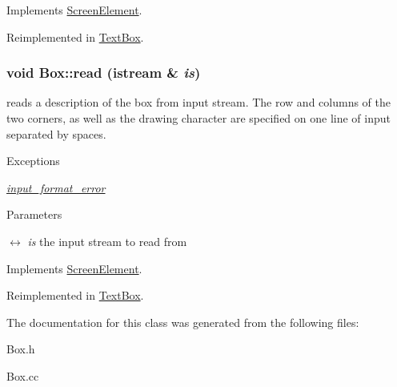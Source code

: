 Implements \hyperlink{classScreenElement_a1bf719edc836cc6ceaa84014c7342028}{ScreenElement}.

Reimplemented in \hyperlink{classTextBox_ae28a00e6cd50d5432c02b579b0fb32ed}{TextBox}.\hypertarget{classBox_ac0ea633a10bf980901766b7aaefdb912}{
\subsubsection[{read}]{\setlength{\rightskip}{0pt plus 5cm}void Box::read (istream \& {\em is})}}
\label{classBox_ac0ea633a10bf980901766b7aaefdb912}
reads a description of the box from input stream. The row and columns of the two corners, as well as the drawing character are specified on one line of input separated by spaces. 
\begin{DoxyExceptions}{Exceptions}
\item[{\em \hyperlink{classinput__format__error}{input\_\-format\_\-error}}]\end{DoxyExceptions}

\begin{DoxyParams}{Parameters}
\item[\mbox{$\leftrightarrow$} {\em is}]the input stream to read from \end{DoxyParams}


Implements \hyperlink{classScreenElement_ae5c8356d0faace202bb3ee620433677e}{ScreenElement}.

Reimplemented in \hyperlink{classTextBox_a3265df3298f92813667d1c70479f7f5c}{TextBox}.

The documentation for this class was generated from the following files:\begin{DoxyCompactItemize}
\item 
Box.h\item 
Box.cc\end{DoxyCompactItemize}
